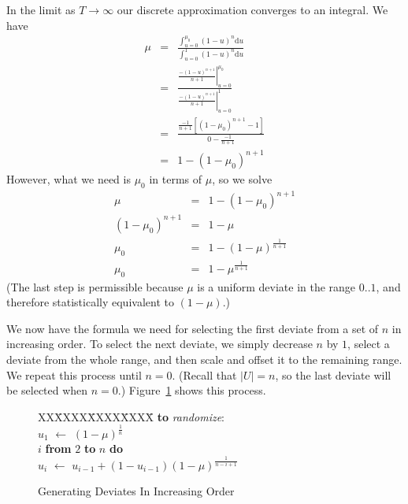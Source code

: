\documentclass[12pt]{article}
\newcommand{\asgn}{\,\,\leftarrow\,\,}
\newcommand{\du}{{\text{d}u}}
\begin{document}
  In the limit as $T\rightarrow\infty$ our discrete
  approximation converges to an integral.  We have
    \begin{eqnarray*}
      \mu &=& \frac{\int_{u=0}^{\mu_0}{(1-u)^n \du}}
                   {\int_{u=0}^{1}{(1-u)^n \du}} \\
	  &=& \frac{\left.\frac{-(1-u)^{n+1}}{n+1}\right|_{u=0}^{\mu_0}}
		   {\left.\frac{-(1-u)^{n+1}}{n+1}\right|_{u=0}^{1}} \\
          &=& \frac{\frac{-1}{n+1}\left[(1-\mu_0)^{n+1}-1\right]}
		   {0-\frac{-1}{n+1}} \\
          &=& 1 - (1 - \mu_0)^{n+1}
    \end{eqnarray*}
  However, what we need is $\mu_0$ in terms of
  $\mu$, so we solve
    \begin{eqnarray*}
       \mu &=& 1 - (1 - \mu_0)^{n+1} \\
       (1 - \mu_0)^{n+1} &=& 1 - \mu \\
       \mu_0 &=& 1 - (1 - \mu)^\frac{1}{n+1} \\
       \mu_0 &=& 1 - \mu^\frac{1}{n+1}
    \end{eqnarray*}
  (The last step is permissible because $\mu$ is a
  uniform deviate in the range $0..1$, and therefore
  statistically equivalent to $(1-\mu)$.)

  We now have the formula we need for selecting the first
  deviate from a set of $n$ in increasing order.  To select
  the next deviate, we simply decrease $n$ by $1$, select a
  deviate from the whole range, and then scale and offset it
  to the remaining range.  We repeat this process until
  $n=0$.  (Recall that $|U|=n$, so the last deviate will be
  selected when $n=0$.)  Figure~\ref{fig-deviate} shows
  this process.
  
  \begin{figure}
    \centering
    \begin{minipage}{0.6\textwidth}
      \begin{tabbing}
      XX\=XXXX\=XXXX\=XXXX\=\kill
      {\bf to} {\it randomize}: \\
      \>$u_1 \asgn (1-\mu)^{\frac{1}{n}}$ \\
       $i$ {\bf from} $2$ {\bf to} $n$ {\bf do} \\
      \>\>$u_i \asgn u_{i-1} + (1-u_{i-1})(1-\mu)^{\frac{1}{n-i+1}}$
    \end{tabbing}
    \end{minipage}
    \caption{Generating Deviates In Increasing Order}\label{fig-deviate}
  \end{figure}
\end{document}
